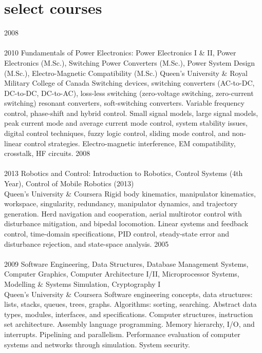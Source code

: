 
\section{select courses}

\begin{entrylist}
\entry
  {2008\\\faChevronDown\\2010}
  {Fundamentals of Power Electronics: Power Electronics I \& II, Power Electronics (M.Sc.), Switching Power Converters (M.Sc.), Power System Design (M.Sc.), Electro-Magnetic Compatibility (M.Sc.)}
  {Queen's University \& Royal Military College of Canada}
  {Switching devices, switching converters (AC-to-DC, DC-to-DC, DC-to-AC), 
  loss-less switching (zero-voltage switching, zero-current switching) resonant converters, soft-switching converters. 
  Variable frequency control, phase-shift and hybrid control. Small signal 
  models, large signal models, peak current mode and average current mode control, system stability issues, 
  digital control techniques, fuzzy logic control, sliding mode control, and non-linear control strategies. 
  Electro-magnetic interference, EM compatibility, crosstalk, HF circuits.}
\entry
  {2008\\\faChevronDown\\2013}
  {Robotics and Control: Introduction to Robotics, Control Systems (4th Year), Control of Mobile Robotics (2013)}
  {\\Queen's University \& Coursera}
  {Rigid body kinematics, manipulator kinematics, workspace, singularity, redundancy, 
  manipulator dynamics, and trajectory generation. Herd navigation and cooperation, aerial multirotor control with disturbance
  mitigation, and bipedal locomotion. Linear systems and feedback control, time-domain specifications, 
  PID control, steady-state error and disturbance rejection, and state-space analysis.}
\entry
  {2005\\\faChevronDown\\2009}
  {Software Engineering, Data Structures, Database Management Systems, Computer Graphics, Computer Architecture I/II, Microprocessor Systems, Modelling \& Systems Simulation, Cryptography I}
  {\\Queen's University \& Coursera}
  {Software engineering concepts, data structures: lists, stacks, queues, trees, graphs. Algorithms: sorting, searching. Abstract data types, modules, interfaces, and specifications.
  Computer structures, instruction set architecture. Assembly language programming. Memory hierarchy, I/O, and interrupts. Pipelining and parallelism.
  Performance evaluation of computer systems and networks through simulation. System security.}
\end{entrylist}